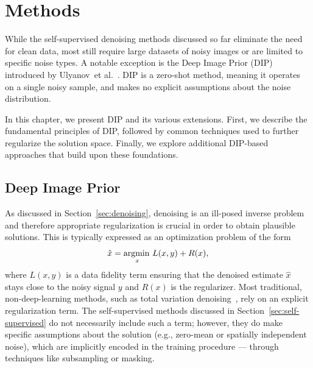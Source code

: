 \chapter{Methods}

While the self-supervised denoising methods discussed so far eliminate the need for clean data, most still require large datasets of noisy images or are limited to specific noise types.
A notable exception is the Deep Image Prior (DIP) introduced by Ulyanov~et al.~\cite{DIP}.
DIP is a zero-shot method, meaning it operates on a single noisy sample, and makes no explicit assumptions about the noise distribution.

In this chapter, we present DIP and its various extensions.
First, we describe the fundamental principles of DIP, followed by common techniques used to further regularize the solution space.
Finally, we explore additional DIP-based approaches that build upon these foundations.

\section{Deep Image Prior}

As discussed in Section~\ref{sec:denoising}, denoising is an ill-posed inverse problem and therefore appropriate regularization is crucial in order to obtain plausible solutions.
This is typically expressed as an optimization problem of the form
\begin{equation}\label{eq:ip-optim}
    \hat{x} = \operatorname*{argmin\,}_x L(x,y) + R(x),
\end{equation}
where $L(x,y)$ is a data fidelity term ensuring that the denoised estimate $\hat{x}$ stays close to the noisy signal $y$ and $R(x)$ is the regularizer.
Most traditional, non-deep-learning methods, such as total variation denoising~\cite{TV}, rely on an explicit regularization term.
The self-supervised methods discussed in Section~\ref{sec:self-supervised} do not necessarily include such a term; however, they do make specific assumptions about the solution (e.g., zero-mean or spatially independent noise), which are implicitly encoded in the training procedure --- through techniques like subsampling or masking.

